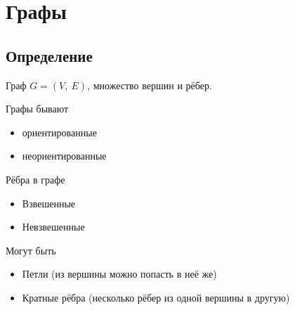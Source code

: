 \documentclass[12pt, a4paper]{article}
\begin{document}
    \section{Графы}
    \subsection{Определение}
    Граф $G = (V,\ E)$, множество вершин и рёбер.
    \begin{center}
        Графы бывают
    \end{center}
    \begin{itemize}
        \item ориентированные
        \item неориентированные
    \end{itemize}
    \begin{center}
        Рёбра в графе
    \end{center}
    \begin{itemize}
        \item Взвешенные
        \item Невзвешенные
    \end{itemize}
    \begin{center}
        Могут быть
    \end{center}
    \begin{itemize}
        \item Петли (из вершины можно попасть в неё же)
        \item Кратные рёбра (несколько рёбер из одной вершины в другую)
    \end{itemize}
\end{document}
